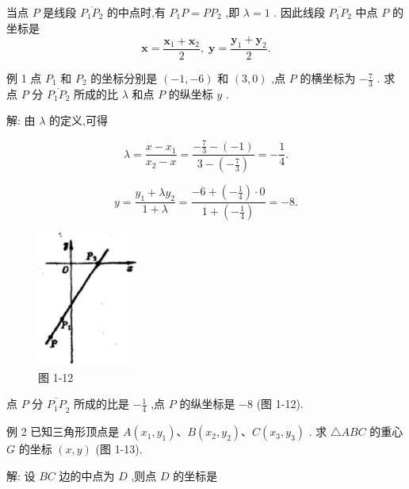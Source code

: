 \documentclass[lang=cn,newtx,10pt,scheme=chinese]{elegantbook}
\begin{document}
\begin{corollary}[中点的坐标]

当点 \(P\) 是线段 \(\overline{{P}_{1}{P}_{2}}\) 的中点时,有 \({P}_{1}P = P{P}_{2}\) ,即 \(\lambda = 1\) . 因此线段 \(\overline{{P}_{1}{P}_{2}}\) 中点 \(P\) 的坐标是
\[
\mathbf{x} = \frac{{\mathbf{x}}_{1} + {\mathbf{x}}_{2}}{2},\;\mathbf{y} = \frac{{\mathbf{y}}_{1} + {\mathbf{y}}_{2}}{2}.
\]
\end{corollary}


例 1 点 \({P}_{1}\) 和 \({P}_{2}\) 的坐标分别是 \(\left( {-1, - 6}\right)\) 和 \(\left( {3,0}\right)\) ,点 \(P\) 的横坐标为 \(- \frac{7}{3}\) . 求点 \(P\) 分 \(\overline{{P}_{1}{P}_{2}}\) 所成的比 \(\lambda\) 和点 \(P\) 的纵坐标 \(y\) .

解: 由 \(\lambda\) 的定义,可得

\[
  \lambda = \frac{x - {x}_{1}}{{x}_{2} - x} = \frac{-\frac{7}{3} - \left( {-1}\right) }{3 - \left( {-\frac{7}{3}}\right) } = - \frac{1}{4}.
\]

\[
  y = \frac{{y}_{1} + \lambda {y}_{2}}{1 + \lambda } = \frac{-6 + \left( {-\frac{1}{4}}\right) \cdot 0}{1 + \left( {-\frac{1}{4}}\right) } = - 8.
\]

\begin{figure}[h]
  \centering
  \includegraphics[max width=0.3\textwidth]{images/01912cc2-ffb6-728e-9ae7-b113ff05c64b_14_690449.jpg}
  \caption{图 1-12}
\end{figure}



点 \(P\) 分 \({\overline{{P}_{1}P}}_{2}\) 所成的比是 \(- \frac{1}{4}\) ,点 \(P\) 的纵坐标是 \(- 8\) (图 1-12).

例 2 已知三角形顶点是 \(A\left( {{x}_{1},{y}_{1}}\right) \text{、}B\left( {{x}_{2},{y}_{2}}\right) \text{、}C\left( {{x}_{3},{y}_{3}}\right)\) . 求 \(\bigtriangleup {ABC}\) 的重心 \(G\) 的坐标 \(\left( {x,y}\right)\) (图 1-13).

解: 设 \({BC}\) 边的中点为 \(D\) ,则点 \(D\) 的坐标是
\end{document}
